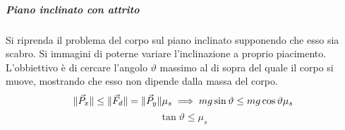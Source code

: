 \documentclass[10pt,a4paper]{book}
\DeclarePairedDelimiter{\norma}{\lVert}{\rVert} %
\begin{document}
\subparagraph{Piano inclinato con attrito} Si riprenda il problema del corpo sul piano inclinato supponendo che esso sia scabro. Si immagini di poterne variare l'inclinazione a proprio piacimento. L'obbiettivo è di cercare l'angolo $\vartheta$ massimo al di sopra del quale il corpo si muove, mostrando che esso non dipende dalla massa del corpo.
\[
	\norma{\vec{P}_x} \le \norma{\vec{F}_d} = \norma{\vec{P}_y}\mu_s 	\implies mg\sin\vartheta\le mg\cos\vartheta \mu_s
\]
\begin{equation}
	\label{eqn:attrito}
	\tan\vartheta \le \mu_s
\end{equation}
\begin{figure}[htpb]
	\centering
	


	\begin{tikzpicture}[x=0.75pt,y=0.75pt,yscale=-1,xscale=1]


\end{tikzpicture}
\end{figure}
\end{document}
